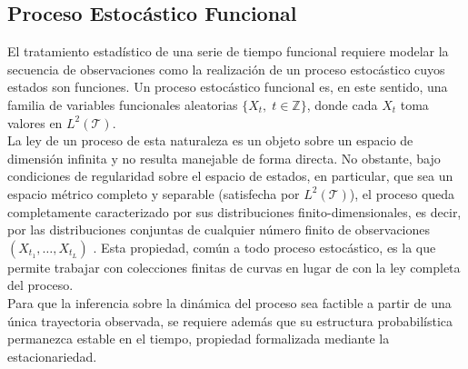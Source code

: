 \subsection{Proceso Estocástico Funcional}
\label{02_02_01_proceso_estocastico_funcional}
El tratamiento estadístico de una serie de tiempo funcional requiere modelar la secuencia de observaciones como la realización de un proceso estocástico cuyos estados son funciones. Un proceso estocástico funcional es, en este sentido, una familia de variables funcionales aleatorias $\{X_t,\; t \in \mathbb{Z}\}$, donde cada $X_t$ toma valores en $L^2(\mathcal{T})$.\\

La ley de un proceso de esta naturaleza es un objeto sobre un espacio de dimensión infinita y no resulta manejable de forma directa. No obstante, bajo condiciones de regularidad sobre el espacio de estados, en particular, que sea un espacio métrico completo y separable (satisfecha por $L^2(\mathcal{T})$), el proceso queda completamente caracterizado por sus distribuciones finito-dimensionales, es decir, por las distribuciones conjuntas de cualquier número finito de observaciones $(X_{t_1}, \dots, X_{t_L})$ \citep{02_02_bosq2000linear}. Esta propiedad, común a todo proceso estocástico, es la que permite trabajar con colecciones finitas de curvas en lugar de con la ley completa del proceso.\\

Para que la inferencia sobre la dinámica del proceso sea factible a partir de una única trayectoria observada, se requiere además que su estructura probabilística permanezca estable en el tiempo, propiedad formalizada mediante la estacionariedad.

